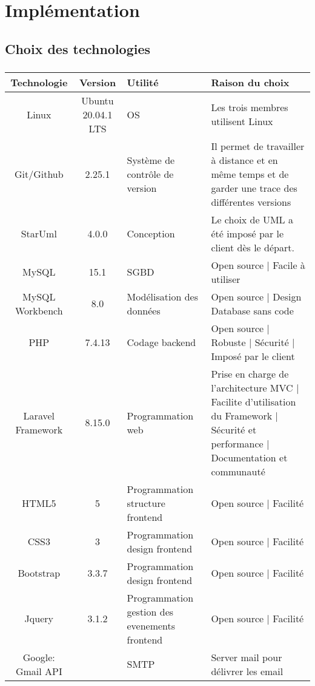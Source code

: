 \chapter{Implémentation}
        \section{Choix des technologies}
\paragraph{}   
\begin{tabular}{|c|c|p{2.7cm}|p{4cm}|}
        \hline
        Technologie & Version & Utilité & Raison du choix \\
        \hline
        Linux & Ubuntu 20.04.1 LTS & OS & Les trois membres utilisent Linux \\
        \hline
        Git/Github & 2.25.1 & Système de contrôle de version & Il permet de travailler à distance et en même temps et de garder une trace des différentes versions\\
        \hline 
        StarUml & 4.0.0 & Conception & Le choix de UML a été imposé par le client dès le départ. \\
        \hline 
        MySQL & 15.1 & SGBD & Open source | Facile à utiliser\\
        \hline 
        MySQL Workbench & 8.0 & Modélisation des données & Open source | Design Database sans code\\
        \hline
        PHP & 7.4.13 & Codage backend & Open source | Robuste | Sécurité | Imposé par le client\\
        \hline
        Laravel Framework & 8.15.0 & Programmation web & Prise en charge de l’architecture MVC | Facilite d’utilisation du Framework | Sécurité et performance | Documentation et communauté\\
        \hline
        HTML5 & 5 & Programmation structure frontend & Open source | Facilité\\
        \hline
        CSS3 & 3 & Programmation design frontend & Open source | Facilité\\
        \hline
        Bootstrap & 3.3.7 & Programmation design frontend & Open source | Facilité\\
        \hline
        Jquery & 3.1.2 & Programmation gestion des evenements frontend & Open source | Facilité\\
        \hline
        Google: Gmail API &  & SMTP & Server mail pour délivrer les email\\
        \hline
\end{tabular}
\par 


